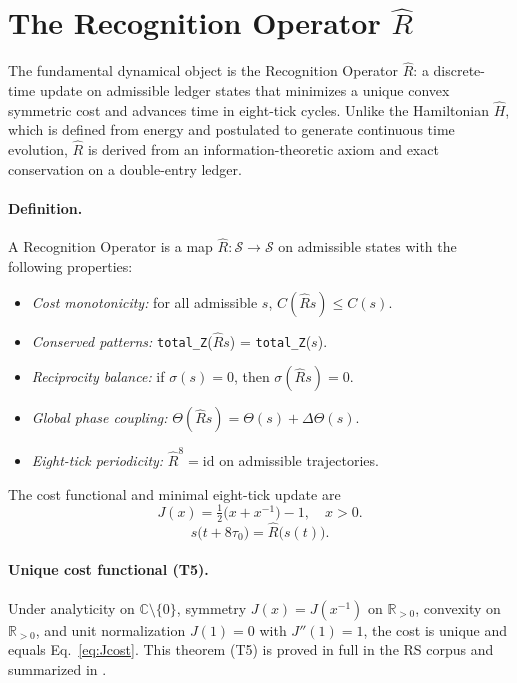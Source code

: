 \documentclass[aps,prx,twocolumn,superscriptaddress,nofootinbib]{revtex4-2}
\newcommand{\Rhat}{\hat{R}}
\newcommand{\Hhat}{\hat{H}}
\newcommand{\Jcost}{J}
\newcommand{\Ccost}{C}
\newcommand{\TauZero}{\tau_{0}}
\newcommand{\ThetaPhase}{\Theta}
\begin{document}
\section{The Recognition Operator $\Rhat$}\label{sec:rhat}
The fundamental dynamical object is the Recognition Operator \(\Rhat\): a discrete-time update on admissible ledger states that minimizes a unique convex symmetric cost and advances time in eight-tick cycles. Unlike the Hamiltonian \(\Hhat\), which is defined from energy and postulated to generate continuous time evolution, \(\Rhat\) is derived from an information-theoretic axiom and exact conservation on a double-entry ledger.

\paragraph*{Definition.} A Recognition Operator is a map \(\Rhat: \mathcal{S}\to\mathcal{S}\) on admissible states with the following properties:
\begin{itemize}
  \item \emph{Cost monotonicity:} for all admissible \(s\), \(\Ccost(\Rhat s)\le \Ccost(s)\).
  \item \emph{Conserved patterns:} \texttt{total\_Z}(\(\Rhat s\)) = \texttt{total\_Z}(\(s\)).
  \item \emph{Reciprocity balance:} if \(\sigma(s)=0\), then \(\sigma(\Rhat s)=0\).
  \item \emph{Global phase coupling:} \(\ThetaPhase(\Rhat s)=\ThetaPhase(s)+\Delta\Theta(s)\).
  \item \emph{Eight-tick periodicity:} \(\Rhat^{8}=\mathrm{id}\) on admissible trajectories.
\end{itemize}
The cost functional and minimal eight-tick update are
\begin{equation}\label{eq:Jcost}
  \Jcost(x) = \tfrac12\bigl(x + x^{-1}\bigr) - 1,\quad x>0.
\end{equation}
\begin{equation}\label{eq:discrete_evolution}
  s\bigl(t+8\TauZero\bigr) = \Rhat\bigl(s(t)\bigr).
\end{equation}

\paragraph*{Unique cost functional (T5).} Under analyticity on \(\mathbb{C}\setminus\{0\}\), symmetry \(\Jcost(x)=\Jcost(x^{-1})\) on \(\mathbb{R}_{>0}\), convexity on \(\mathbb{R}_{>0}\), and unit normalization \(\Jcost(1)=0\) with \(\Jcost''(1)=1\), the cost is unique and equals Eq.~\eqref{eq:Jcost}. This theorem (T5) is proved in full in the RS corpus and summarized in \cite{Quantum-Gravity,Deductive-Measurement}.
\end{document}
